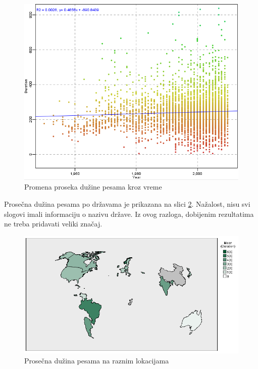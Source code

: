 \begin{figure}[H]
    \centering
    \includegraphics[scale=0.7]{resources/mean-year-duration.PNG}
    \caption{Promena proseka du\v{z}ine pesama kroz vreme}
    \label{fig:YearDurationAvg}
\end{figure}


Prose\v{c}na du\v{z}ina pesama po dr\v{z}avama je prikazana na slici \ref{fig:CountryDuration}. Na\v{z}alost, nisu svi slogovi imali informaciju o nazivu dr\v{z}ave. Iz ovog razloga, dobijenim rezultatima ne treba pridavati veliki zna\v{c}aj.

\begin{figure}[H]
    \centering
    \includegraphics[scale=0.45]{resources/country-duration.png}
    \caption{Prose\v{c}na du\v{z}ina pesama na raznim lokacijama}
    \label{fig:CountryDuration}
\end{figure}


